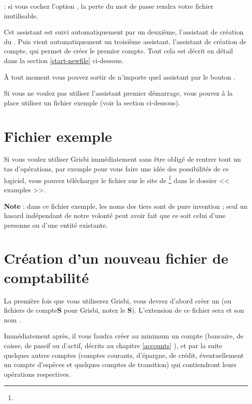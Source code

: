 \textcolor{red}{}: si vous cochez l'option , la perte du mot de passe rendra votre fichier inutilisable.

Cet assistant est suivi automatiquement par un deuxième, l'assistant de création du . Puis vient automatiquement un troisième assistant, l'assistant de création de compte, qui permet de créer le premier compte. Tout cela est décrit en détail dans la section \ref{start-newfile} ci-dessous.

À tout moment vous pouvez sortir de n'importe quel assistant par le bouton .

Si vous ne voulez pas utiliser l'assistant premier démarrage, vous pouvez à la
place utiliser un fichier exemple (voir la section ci-dessous).


\section{Fichier exemple\label{start-example}}


Si vous voulez utiliser Grisbi immédiatement sans être obligé de rentrer tout un tas d'opérations, par exemple pour vous faire une idée des possibilités de ce logiciel, vous pouvez télécharger le fichier  sur le site de \footnote{\urlSourceForgeDocumentation{}} dans le dossier << \textsf{examples} >>.

\textbf{Note} : dans ce fichier exemple, les noms des tiers sont de pure invention ; seul un hasard indépendant de notre volonté peut avoir fait que ce soit celui d'une personne ou d'une entité existante.


\section{Création d'un nouveau fichier de comptabilité\label{start-newfile}}


La première fois que vous utiliserez Grisbi, vous devrez d'abord créer un  (ou fichiers de compte\textbf{S} pour Grisbi, notez le \textbf{S}). L'\gls{extension} de ce fichier sera  et son nom . 

Immédiatement après, il vous faudra créer au minimum un compte (bancaire, de caisse, de passif ou d'actif, décrits au chapitre \vref{accounts} ), et par la suite quelques autres comptes (comptes courants, d'épargne, de crédit, éventuellement un compte d'espèces et quelques comptes de transition) qui contiendront leurs opérations respectives. 

